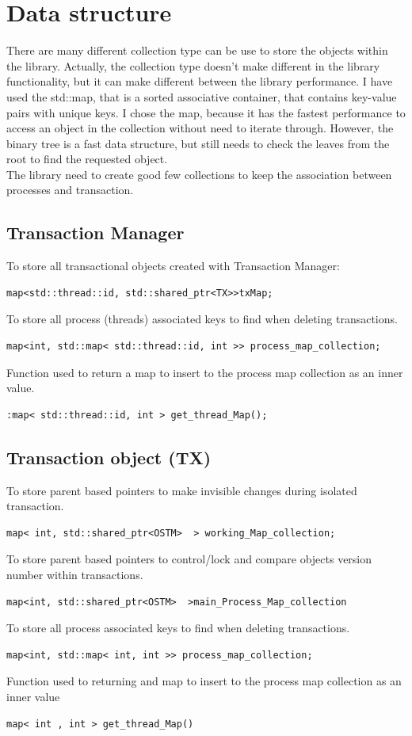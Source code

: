\documentclass[12pt]{article}
\begin{document}
\section{Data structure}
There are many different collection type can be use to store the objects within the library. Actually, the collection type doesn't make different in the library functionality, but it can make different between the library performance. I have used the std::map, that is a sorted associative container, that contains key-value pairs with unique keys. I chose the map, because it has the fastest performance to access an object in the collection without need to iterate through. However, the binary tree is a fast data structure, but still needs to check the leaves from the root to find the requested object.\\

The library need to create good few collections to keep the association between processes and transaction.
\subsection{Transaction Manager}
To store all transactional objects created with Transaction Manager:
\begin{lstlisting}
map<std::thread::id, std::shared_ptr<TX>>txMap;
\end{lstlisting}
To store all process (threads) associated keys to find when deleting transactions. 
\begin{lstlisting}
map<int, std::map< std::thread::id, int >> process_map_collection;
\end{lstlisting}
Function used to return a map to insert to the process map collection as an inner value.
\begin{lstlisting}
:map< std::thread::id, int > get_thread_Map();
\end{lstlisting}
\subsection{Transaction object (TX)}
To store parent based pointers to make invisible changes during isolated transaction.
\begin{lstlisting}
map< int, std::shared_ptr<OSTM>  > working_Map_collection;
\end{lstlisting}
To store parent based pointers to control/lock and compare objects version number within transactions.
\begin{lstlisting}
map<int, std::shared_ptr<OSTM>  >main_Process_Map_collection
\end{lstlisting}
To store all process associated keys to find when deleting transactions.
\begin{lstlisting}
map<int, std::map< int, int >> process_map_collection;
\end{lstlisting}
Function used to returning and map to insert to the process map collection as an inner value
\begin{lstlisting}
map< int , int > get_thread_Map()
\end{lstlisting}
\end{document}
